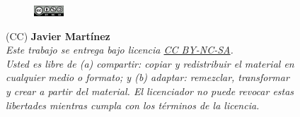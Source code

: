 
\vspace{5cm}

\begin{flushright}

\begin{figure}
\includegraphics[width=0.10\textwidth,right]{figs/by-nc-sa.png}
\end{figure}

\vspace{0.2cm}

{\tiny 
(CC) \textbf{Javier Martínez}\\ %
\vspace{0.5cm}
\emph{
Este trabajo se entrega bajo licencia \href{https://creativecommons.org/licenses/by-nc-sa/3.0/es/}{CC BY-NC-SA}. \\
Usted es libre de \textit{(a) compartir}: copiar y redistribuir el material en \\
cualquier medio o formato; y \textit{(b) adaptar}: remezclar, transformar \\
y crear a partir del material. El licenciador no puede revocar estas \\
libertades mientras cumpla con los términos de la licencia. \\}
}

\end{flushright}

